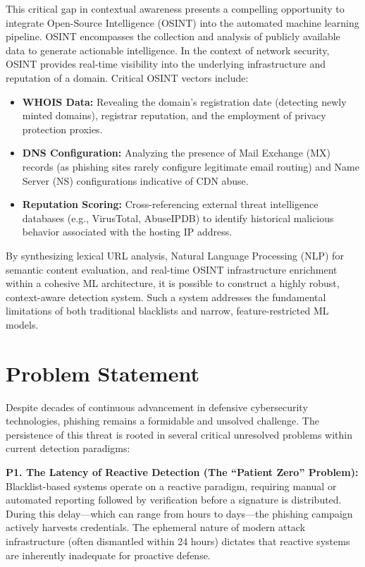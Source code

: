This critical gap in contextual awareness presents a compelling
opportunity to integrate Open-Source Intelligence (OSINT) into the
automated machine learning pipeline. OSINT encompasses the collection
and analysis of publicly available data to generate actionable
intelligence. In the context of network security, OSINT provides
real-time visibility into the underlying infrastructure and reputation
of a domain. Critical OSINT vectors include:

\begin{itemize}
\item
  \textbf{WHOIS Data:} Revealing the domain's registration date
  (detecting newly minted domains), registrar reputation, and the
  employment of privacy protection proxies.
\item
  \textbf{DNS Configuration:} Analyzing the presence of Mail Exchange
  (MX) records (as phishing sites rarely configure legitimate email
  routing) and Name Server (NS) configurations indicative of CDN abuse.
\item
  \textbf{Reputation Scoring:} Cross-referencing external threat
  intelligence databases (e.g., VirusTotal, AbuseIPDB) to identify
  historical malicious behavior associated with the hosting IP address.
\end{itemize}

By synthesizing lexical URL analysis, Natural Language Processing (NLP)
for semantic content evaluation, and real-time OSINT infrastructure
enrichment within a cohesive ML architecture, it is possible to
construct a highly robust, context-aware detection system. Such a system
addresses the fundamental limitations of both traditional blacklists and
narrow, feature-restricted ML models.

\section{Problem Statement}\label{problem-statement}

Despite decades of continuous advancement in defensive cybersecurity
technologies, phishing remains a formidable and unsolved challenge. The
persistence of this threat is rooted in several critical unresolved
problems within current detection paradigms:

\textbf{P1. The Latency of Reactive Detection (The ``Patient Zero''
Problem):} Blacklist-based systems operate on a reactive paradigm,
requiring manual or automated reporting followed by verification before
a signature is distributed. During this delay---which can range from
hours to days---the phishing campaign actively harvests credentials. The
ephemeral nature of modern attack infrastructure (often dismantled
within 24 hours) dictates that reactive systems are inherently
inadequate for proactive defense.

